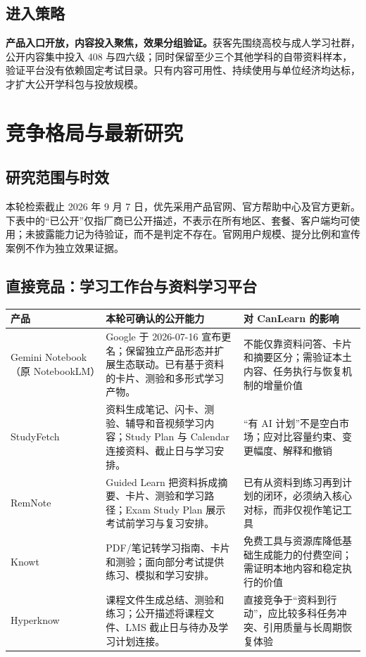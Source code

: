 \documentclass[UTF8,a4paper,11pt,fontset=none]{ctexart}
\newcommand{\cth}[1]{\textbf{\sffamily #1}}
\newcommand{\newsec}[1]{\clearpage\section{#1}}
\newenvironment{tbl}{\par\vspace{3pt}\small\noindent\ignorespaces}{\unskip\par\vspace{5pt}}
\begin{document}
\subsection{进入策略}
\textbf{产品入口开放，内容投入聚焦，效果分组验证。}获客先围绕高校与成人学习社群，公开内容集中投入 408 与四六级；同时保留至少三个其他学科的自带资料样本，验证平台没有依赖固定考试目录。只有内容可用性、持续使用与单位经济均达标，才扩大公开学科包与投放规模。

\newsec{竞争格局与最新研究}
\subsection{研究范围与时效}
本轮检索截止 2026 年 9 月 7 日，优先采用产品官网、官方帮助中心及官方更新。下表中的“已公开”仅指厂商已公开描述，不表示在所有地区、套餐、客户端均可使用；未披露能力记为待验证，而不是判定不存在。官网用户规模、提分比例和宣传案例不作为独立效果证据。

\subsection{直接竞品：学习工作台与资料学习平台}
\begin{tbl}
\begin{tabularx}{\linewidth}{@{}L{28mm}YY@{}}
\toprule
\cth{产品}&\cth{本轮可确认的公开能力}&\cth{对 CanLearn 的影响}\\\midrule
Gemini Notebook\newline（原 NotebookLM）&Google 于 2026-07-16 宣布更名；保留独立产品形态并扩展生态联动。已有基于资料的卡片、测验和多形式学习产物。\cite{google_rename,google_study}&不能仅靠资料问答、卡片和摘要区分；需验证本土内容、任务执行与恢复机制的增量价值\\
StudyFetch&资料生成笔记、闪卡、测验、辅导和音视频学习内容；Study Plan 与 Calendar 连接资料、截止日与学习安排。\cite{studyfetch,studyplan}&“有 AI 计划”不是空白市场；应对比容量约束、变更幅度、解释和撤销\\
RemNote&Guided Learn 把资料拆成摘要、卡片、测验和学习路径；Exam Study Plan 展示考试前学习与复习安排。\cite{remnote_guided,remnote_exam}&已有从资料到练习再到计划的闭环，必须纳入核心对标，而非仅视作笔记工具\\
Knowt&PDF/笔记转学习指南、卡片和测验；面向部分考试提供练习、模拟和学习安排。\cite{knowt}&免费工具与资源库降低基础生成能力的付费空间；需证明本地内容和稳定执行的价值\\
Hyperknow&课程文件生成总结、测验和练习；公开描述将课程文件、LMS 截止日与待办及学习计划连接。\cite{hyperknow}&直接竞争于“资料到行动”，应比较多科任务冲突、引用质量与长周期恢复体验\\
\bottomrule
\end{tabularx}
\end{tbl}
\end{document}
